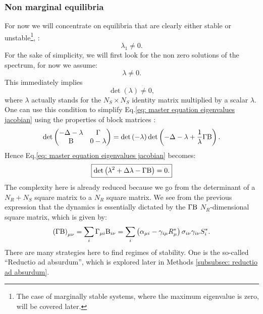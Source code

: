 \documentclass[12pt, titlepage]{report}
\begin{document}
\subsubsection{Non marginal equilibria}\label{section: non marginal equilibria}
For now we will concentrate on equilibria that are clearly either stable or unstable\footnote{The case of marginally stable systems, where the maximum eigenvalue is zero, will be covered later.}, \ie:
\begin{equation}
\lambda_1 \neq 0.
\end{equation}
For the sake of simplicity, we will first look for the non zero solutions of the spectrum, \ie for now we assume:
\begin{equation}
\lambda \neq 0.
\end{equation}
This immediately implies
\begin{equation}
\det\left(\lambda\right)\neq 0,
\end{equation}
where $\lambda$ actually stands for the $N_S \times N_S$ identity matrix multiplied by a scalar $\lambda$. One can use this condition to simplify Eq.\eqref{eq: master equation eigenvalues jacobian} using the properties of block matrices \cite{powell_calculating_2011}:
\begin{equation}
\det
\begin{pmatrix}
  -\Delta - \lambda  & \Gamma \\
  \text{B} & 0-\lambda
\end{pmatrix} =
\det\left(-\lambda\right)\det\left(-\Delta- \lambda+\frac{1}{\lambda}\Gamma \text{B}\right).
\end{equation}
Hence Eq.\eqref{eq: master equation eigenvalues jacobian} becomes:
\begin{equation}
\boxed{
\det\left(\lambda^2+\Delta \lambda-\Gamma \text{B}\right)=0. \label{eq: master equation non marginal}
}
\end{equation}
The complexity here is already reduced because we go from the determinant of a $N_R+N_S$ square matrix to a $N_R$ square matrix. We see from the previous expression that the dynamics is essentially dictated by the $\Gamma \text{B}$ $N_R$-dimensional square matrix, which is given by:
\begin{equation}
\left(\Gamma \text{B}\right)_{\mu \nu} = \sum_i \Gamma_{\mu i} \text{B}_{i \nu} = \sum_i \left(\alpha_{\mu i}-\gamma_{i \mu} R^*_\mu \right)\sigma_{i\nu}\gamma_{i\nu}S^*_i.
\end{equation}
There are many strategies here to find regimes of stability. One is the so-called ``Reductio ad absurdum'', which is explored later in Methods \ref{subsubsec: reductio ad absurdum}.
\end{document}
